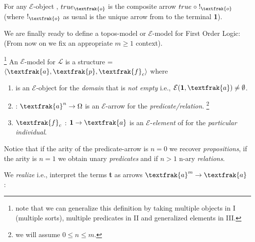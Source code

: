 \begin{definition}
	For any $\mathcal{E}$-object , \newline
	$true_\textfrak{o}$ is the composite arrow $true \;\circ\; !_\textfrak{o}$ \newline
	(where $!_\textfrak{o}$ as usual is the unique arrow from  to the terminal \textbf{1}).
	
\end{definition}


We are finally ready to define a topos-model or $\mathcal{E}$-model for First Order Logic:
(From now on we fix an appropriate $m \geq 1$ context).

\begin{definition} \footnote{note that we can generalize this definition by taking multiple objects in I (multiple sorts), multiple predicates in II and generalized elements in III.}
	An $\mathcal{E}$-model for $\mathcal{L}$ is a structure =$\langle \textfrak{a}, \textfrak{p}, \textfrak{f}_c \rangle$ where
	\begin{enumerate}[label=\Roman*]
		\item 	\;\; is an $\mathcal{E}$-object for the \emph{domain} that is \emph{not empty} i.e., $\mathcal{E}(\textbf{1},\textfrak{a})\neq \emptyset$.
		\item 	 \;\; 	:	$\textfrak{a}^n \rightarrow \Omega$ is an $\mathcal{E}$-arrow for the \emph{predicate/relation}. \footnote{we will assume $0 \leq n \leq m$.}
		\item 	\;\;$\textfrak{f}_c$	:	$\textbf{1} \rightarrow \textfrak{a}$ is an $\mathcal{E}$-\emph{element} of  for the \emph{particular individual}.
	\end{enumerate}
\end{definition}

\begin{remark}
	Notice that if the arity of the predicate-arrow is $n=0$ we recover \emph{propositions}, if the arity is $n=1$ we obtain unary \emph{predicates} and if $n>1$ n-ary \emph{relations}. 
\end{remark}
We \emph{realize} i.e., interpret the terms \textbf{t} as arrows $\textfrak{a}^m \rightarrow \textfrak{a}$ :

